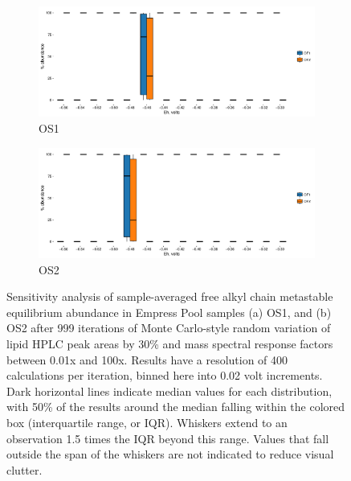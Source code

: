 \begin{figure}[h]
\centering

    \begin{subfigure}[b]{\linewidth}
      	\includegraphics[width=1\linewidth]{"figs_app2/boxplot_ggplot_02bin Octopus OF1 iter 999"}
      	\caption{OS1}
        \label{fig:OS1_mc}
    \end{subfigure}
    \begin{subfigure}[b]{\linewidth}
    	\includegraphics[width=1\linewidth]{"figs_app2/boxplot_ggplot_02bin Octopus OF2 iter 999"}
    	\caption{OS2}
        \label{fig:OS2_mc}
    \end{subfigure}

    
    \caption[Sensitivity analysis of sample-averaged free alkyl chain metastable equilibrium abundance in Empress Pool samples]{Sensitivity analysis of sample-averaged free alkyl chain metastable equilibrium abundance in Empress Pool samples (a) OS1, and (b) OS2 after 999 iterations of Monte Carlo-style random variation of lipid HPLC peak areas by 30\% and mass spectral response factors between 0.01x and 100x. Results have a resolution of 400 calculations per iteration, binned here into 0.02 volt increments. Dark horizontal lines indicate median values for each distribution, with 50\% of the results around the median falling within the colored box (interquartile range, or IQR). Whiskers extend to an observation 1.5 times the IQR beyond this range. Values that fall outside the span of the whiskers are not indicated to reduce visual clutter.}
    \label{fig:OS_mc}
\end{figure}